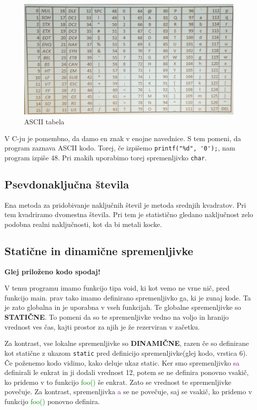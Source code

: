 \documentclass[a4paper, 12pt]{article}
\begin{document}
\begin{figure}[h!]
	\centering
	\includegraphics[width=0.7\linewidth]{images/ascii.jpg}
	\caption{ASCII tabela}
	\label{fig:ascii-tabela }
\end{figure}

V C-ju je pomembno, da damo en znak v enojne navednice. S tem pomeni, da program zaznava ASCII kodo. Torej, če izpišemo \lstinline|printf("%d", '0');|, nam program izpiše 48. Pri znakih uporabimo torej spremenljivko \lstinline|char|.

\subsection{Psevdonaključna števila}
Ena metoda za pridobivanje naključnih števil je metoda srednjih kvadratov.
Pri tem kvadriramo dvomestna števila. Pri tem je statistično gledano naključnost zelo podobna realni naključnosti, kot da bi metali kocke.

\subsection{Statične in dinamične spremenljivke}
\textbf{Glej priloženo kodo spodaj!}

V temu programu imamo funkcijo tipa void, ki kot vemo ne vrne nič, pred funkcijo main. prav tako imamo definirano spremenljivko ga, ki je zunaj kode. Ta je zato globalna in je uporabna v vseh funkcijah. Te globalne spremenljivke so \textbf{STATIČNE}. To pomeni da so te spremenljivke vedno na voljo in hranijo vrednost ves čas, kajti prostor za njih je že rezerviran v začetku.

Za kontrast, vse lokalne spremenljivke so \textbf{DINAMIČNE}, razen če so definirane kot statične z ukazom \lstinline|static| pred definicijo spremenljivke(glej kodo, vrstica 6). Če poženemo kodo vidimo, kako deluje ukaz static. Ker smo spremenljivko \textcolor{purple}{sa} definirali le enkrat in ji dodali vrednost 12, potem se ne definira ponovno vsakič, ko pridemo v to funkcijo \textcolor{green}{foo()} še enkrat. Zato se vrednost te spremenljivke povečuje. Za kontrast, spremenljivka \textcolor{purple}{a} se ne povečuje, saj se vsakič, ko pridemo v funkcijo \textcolor{green}{foo()} ponovno definira.
\end{document}

